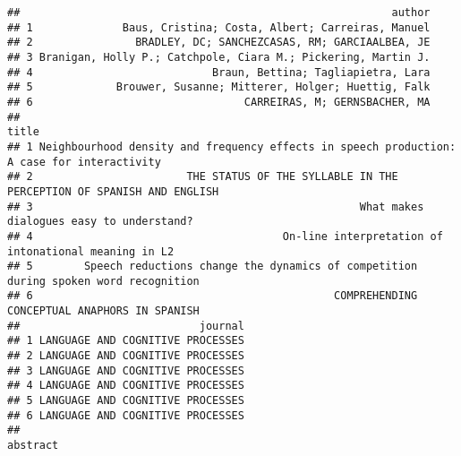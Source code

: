 \documentclass[cm]{glossa}
\begin{document}
\begin{verbatim}
##                                                          author
## 1              Baus, Cristina; Costa, Albert; Carreiras, Manuel
## 2                BRADLEY, DC; SANCHEZCASAS, RM; GARCIAALBEA, JE
## 3 Branigan, Holly P.; Catchpole, Ciara M.; Pickering, Martin J.
## 4                            Braun, Bettina; Tagliapietra, Lara
## 5             Brouwer, Susanne; Mitterer, Holger; Huettig, Falk
## 6                                 CARREIRAS, M; GERNSBACHER, MA
##                                                                                        title
## 1 Neighbourhood density and frequency effects in speech production: A case for interactivity
## 2                        THE STATUS OF THE SYLLABLE IN THE PERCEPTION OF SPANISH AND ENGLISH
## 3                                                   What makes dialogues easy to understand?
## 4                                       On-line interpretation of intonational meaning in L2
## 5        Speech reductions change the dynamics of competition during spoken word recognition
## 6                                               COMPREHENDING CONCEPTUAL ANAPHORS IN SPANISH
##                            journal
## 1 LANGUAGE AND COGNITIVE PROCESSES
## 2 LANGUAGE AND COGNITIVE PROCESSES
## 3 LANGUAGE AND COGNITIVE PROCESSES
## 4 LANGUAGE AND COGNITIVE PROCESSES
## 5 LANGUAGE AND COGNITIVE PROCESSES
## 6 LANGUAGE AND COGNITIVE PROCESSES
##                                                                                                                                                                                                                                                                                                                                                                                                                                                                                                                                                                                                                                                                                                                                                                                                                                                                                                                                                                                                                                                                                                                                                                                                                                                                                                                                                                                                                                                                                                                                                                                                                                                                                    abstract

\end{verbatim}
\end{document}
